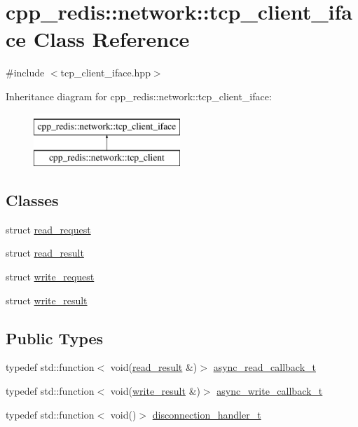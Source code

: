 \hypertarget{classcpp__redis_1_1network_1_1tcp__client__iface}{}\section{cpp\+\_\+redis\+:\+:network\+:\+:tcp\+\_\+client\+\_\+iface Class Reference}
\label{classcpp__redis_1_1network_1_1tcp__client__iface}


{\ttfamily \#include $<$tcp\+\_\+client\+\_\+iface.\+hpp$>$}

Inheritance diagram for cpp\+\_\+redis\+:\+:network\+:\+:tcp\+\_\+client\+\_\+iface\+:\begin{figure}[H]
\begin{center}
\leavevmode
\includegraphics[height=2.000000cm]{classcpp__redis_1_1network_1_1tcp__client__iface}
\end{center}
\end{figure}
\subsection*{Classes}
\begin{DoxyCompactItemize}
\item 
struct \hyperlink{structcpp__redis_1_1network_1_1tcp__client__iface_1_1read__request}{read\+\_\+request}
\item 
struct \hyperlink{structcpp__redis_1_1network_1_1tcp__client__iface_1_1read__result}{read\+\_\+result}
\item 
struct \hyperlink{structcpp__redis_1_1network_1_1tcp__client__iface_1_1write__request}{write\+\_\+request}
\item 
struct \hyperlink{structcpp__redis_1_1network_1_1tcp__client__iface_1_1write__result}{write\+\_\+result}
\end{DoxyCompactItemize}
\subsection*{Public Types}
\begin{DoxyCompactItemize}
\item 
typedef std\+::function$<$ void(\hyperlink{structcpp__redis_1_1network_1_1tcp__client__iface_1_1read__result}{read\+\_\+result} \&)$>$ \hyperlink{classcpp__redis_1_1network_1_1tcp__client__iface_ae8bf79e8e1f1d7e359ed1c7cdc4026fc}{async\+\_\+read\+\_\+callback\+\_\+t}
\item 
typedef std\+::function$<$ void(\hyperlink{structcpp__redis_1_1network_1_1tcp__client__iface_1_1write__result}{write\+\_\+result} \&)$>$ \hyperlink{classcpp__redis_1_1network_1_1tcp__client__iface_a1dc52ccc70cf377c4fbb495a16adc658}{async\+\_\+write\+\_\+callback\+\_\+t}
\item 
typedef std\+::function$<$ void()$>$ \hyperlink{classcpp__redis_1_1network_1_1tcp__client__iface_a9a7d5942205db8be03da581a848b8ec0}{disconnection\+\_\+handler\+\_\+t}
\end{DoxyCompactItemize}
